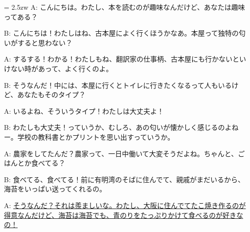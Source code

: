 \documentclass[11pt]{amsart}
\title{}
\author{}
\newenvironment{hangall}[1]{\hangindent = 2.5zw\everypar{\hangindent = 2.5zw}}{}
\begin{document}
\maketitle
\begin{hangall}{}%
A: こんにちは。わたし、本を読むのが趣味なんだけど、あなたは趣味ってある？

B: こんにちは！わたしはね、古本屋によく行くほうかなあ。本屋って独特の匂いがすると思わない？

A: するする！わかる！わたしもね、翻訳家の仕事柄、古本屋にも行かないといけない時があって、よく行くのよ。

B: そうなんだ！中には、本屋に行くとトイレに行きたくなるって人もいるけど、あなたもそのタイプ？

A: いるよね、そういうタイプ！わたしは大丈夫よ！

B: わたしも大丈夫！っていうか、むしろ、あの匂いが懐かしく感じるのよねー。学校の教科書とかプリントを思い出すっていうか。

A: 農家をしてたんだ？農家って、一日中働いて大変そうだよね。ちゃんと、ごはんとか食べてる？

B: 食べてる、食べてる！前に有明湾のそばに住んでて、親戚がまだいるから、海苔をいっぱい送ってくれるの。

A: \ul{そうなんだ？それは羨ましいな。わたし、大阪に住んでてたこ焼き作るのが得意なんだけど、海苔は海苔でも、青のりをたっぷりかけて食べるのが好きなの！}\end{hangall}
\end{document}
